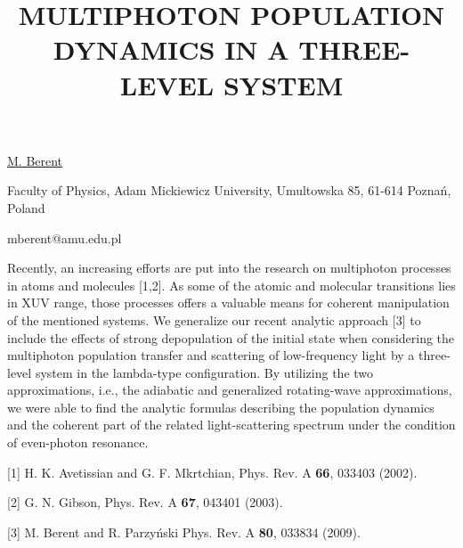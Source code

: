 \title{MULTIPHOTON POPULATION DYNAMICS IN A THREE-LEVEL SYSTEM}

\underline{M. Berent} 

{\normalsize{\vspace{-4mm}
Faculty of Physics, Adam Mickiewicz University, Umultowska 85, 61-614 Pozna\'n, Poland

\email mberent@amu.edu.pl}}

Recently, an increasing efforts are put into the research on multiphoton processes in atoms and molecules [1,2]. As some of the atomic and molecular transitions lies in XUV range, those processes offers a valuable means for coherent manipulation of the mentioned systems.
We generalize our recent analytic approach [3] to include the effects of strong depopulation of the initial state when considering the multiphoton population transfer and scattering of low-frequency light by a three-level system in the lambda-type configuration. By utilizing the two approximations, i.e., the adiabatic and generalized rotating-wave approximations, we were able to find the analytic formulas describing the population dynamics and the coherent part of the related light-scattering spectrum under the condition of even-photon resonance.

{\normalsize
[1] H. K. Avetissian and G. F. Mkrtchian, Phys. Rev. A \textbf{66}, 033403 (2002).
\vsp

[2] G. N. Gibson, Phys. Rev. A \textbf{67}, 043401 (2003).
\vsp

[3] M. Berent and R. Parzy\'nski Phys. Rev. A \textbf{80}, 033834 (2009).
}

\vspace{\baselineskip} 